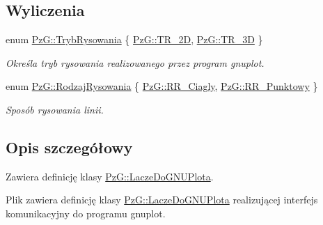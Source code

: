 \subsection*{Wyliczenia}
\begin{DoxyCompactItemize}
\item 
enum \hyperlink{namespace_pz_g_aeedae1ef10c66d720f9e89de408ca4ca}{Pz\+G\+::\+Tryb\+Rysowania} \{ \hyperlink{namespace_pz_g_aeedae1ef10c66d720f9e89de408ca4caa5eb0cf8b3405e136f092efdb489d60c4}{Pz\+G\+::\+T\+R\+\_\+2D}, 
\hyperlink{namespace_pz_g_aeedae1ef10c66d720f9e89de408ca4caa856e6b0fa6b8a9dc184c60cf27dcc5d2}{Pz\+G\+::\+T\+R\+\_\+3D}
 \}\begin{DoxyCompactList}\small\item\em Określa tryb rysowania realizowanego przez program {\ttfamily gnuplot}. \end{DoxyCompactList}
\item 
enum \hyperlink{namespace_pz_g_a705c92106f39b7d0c34a6739d10ff0b6}{Pz\+G\+::\+Rodzaj\+Rysowania} \{ \hyperlink{namespace_pz_g_a705c92106f39b7d0c34a6739d10ff0b6a927eaa159aa4bd3198f0a330b967746d}{Pz\+G\+::\+R\+R\+\_\+\+Ciagly}, 
\hyperlink{namespace_pz_g_a705c92106f39b7d0c34a6739d10ff0b6aa01097ee8266d6402b752ef6f9a4690c}{Pz\+G\+::\+R\+R\+\_\+\+Punktowy}
 \}\begin{DoxyCompactList}\small\item\em Sposób rysowania linii. \end{DoxyCompactList}
\end{DoxyCompactItemize}


\subsection{Opis szczegółowy}
Zawiera definicję klasy \hyperlink{class_pz_g_1_1_lacze_do_g_n_u_plota}{Pz\+G\+::\+Lacze\+Do\+G\+N\+U\+Plota}. 

Plik zawiera definicję klasy \hyperlink{class_pz_g_1_1_lacze_do_g_n_u_plota}{Pz\+G\+::\+Lacze\+Do\+G\+N\+U\+Plota} realizującej interfejs komunikacyjny do programu gnuplot. 